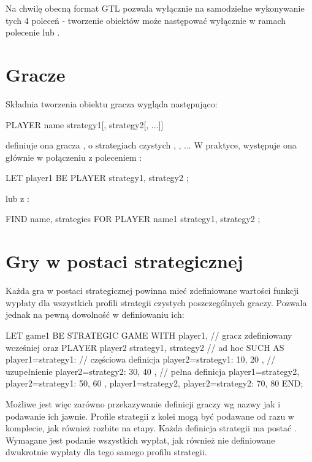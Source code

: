 \documentclass[polish]{standalone}
\begin{document}
Na chwilę obecną format GTL pozwala wyłącznie na samodzielne wykonywanie tych 4 poleceń - tworzenie obiektów może 
następować wyłącznie w ramach polecenie  lub .

\section{Gracze}

Składnia tworzenia obiektu gracza wygląda następująco:

\begin{gtl}
PLAYER name { strategy1[, strategy2[, ...]] }
\end{gtl}

definiuje ona gracza , o strategiach czystych , , ... W praktyce, występuje
ona głównie w połączeniu z poleceniem :

\begin{gtl}
LET player1 BE PLAYER { strategy1, strategy2 };
\end{gtl}

lub z :

\begin{gtl}
FIND name, strategies
 FOR PLAYER name1 { strategy1, strategy2 };
\end{gtl}

\section{Gry w postaci strategicznej}

Każda gra w postaci strategicznej powinna mieć zdefiniowane wartości funkcji wypłaty dla wszystkich profili strategii
czystych poszczególnych graczy. Pozwala jednak na pewną dowolność w definiowaniu ich:

\begin{gtl}
LET game1 BE
  STRATEGIC GAME
  WITH
    player1, // gracz zdefiniowany wcześniej oraz
    PLAYER player2 { strategy1, strategy2 } // ad hoc
  SUCH AS
    { player1=strategy1: // częściowa definicja
     { player2=strategy1: 10, 20 }, // uzupełnienie
     { player2=strategy2: 30, 40 }
    },
    // pełna definicja
    { player1=strategy2, player2=strategy1: 50, 60 },
    { player1=strategy2, player2=strategy2: 70, 80 }
  END;
\end{gtl}

Możliwe jest więc zarówno przekazywanie definicji graczy wg nazwy jak i podawanie ich jawnie. Profile strategii z
kolei mogą być podawane od razu w komplecie, jak również rozbite na etapy. Każda definicja strategii ma postać
. Wymagane jest podanie
wszystkich wypłat, jak również nie definiowane dwukrotnie wypłaty dla tego samego profilu strategii.
\end{document}

